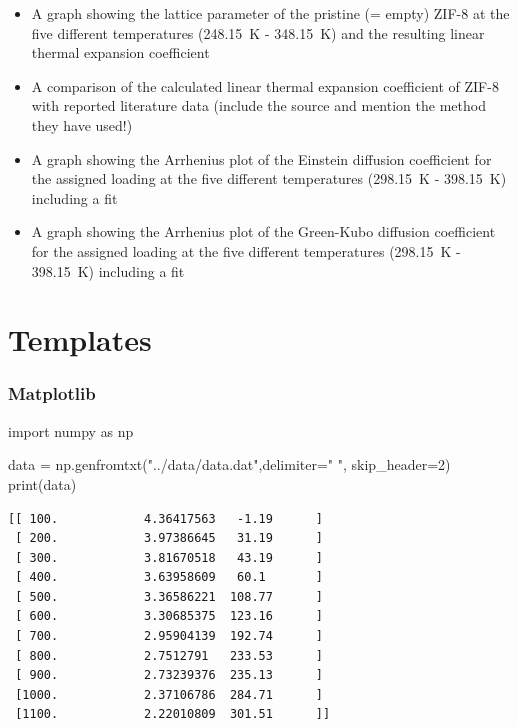 \documentclass[
  letterpaper,
]{article}
\newenvironment{Shaded}{\begin{snugshade}}{\end{snugshade}}
\newcommand{\BuiltInTok}[1]{\textcolor[rgb]{0.00,0.23,0.31}{#1}}
\newcommand{\DecValTok}[1]{\textcolor[rgb]{0.68,0.00,0.00}{#1}}
\newcommand{\ImportTok}[1]{\textcolor[rgb]{0.00,0.46,0.62}{#1}}
\newcommand{\NormalTok}[1]{\textcolor[rgb]{0.00,0.23,0.31}{#1}}
\newcommand{\OperatorTok}[1]{\textcolor[rgb]{0.37,0.37,0.37}{#1}}
\newcommand{\StringTok}[1]{\textcolor[rgb]{0.13,0.47,0.30}{#1}}
\providecommand{\tightlist}{%
  \setlength{\itemsep}{0pt}\setlength{\parskip}{0pt}}\usepackage{longtable,booktabs,array}
\begin{document}
\begin{itemize}
\tightlist
\item[$\square$]
  A graph showing the lattice parameter of the pristine (= empty) ZIF-8
  at the five different temperatures (248.15~K - 348.15~K) and the
  resulting linear thermal expansion coefficient
\item[$\square$]
  A comparison of the calculated linear thermal expansion coefficient of
  ZIF-8 with reported literature data (include the source and mention
  the method they have used!)
\item[$\square$]
  A graph showing the Arrhenius plot of the Einstein diffusion
  coefficient for the assigned loading at the five different
  temperatures (298.15~K - 398.15~K) including a fit
\item[$\square$]
  A graph showing the Arrhenius plot of the Green-Kubo diffusion
  coefficient for the assigned loading at the five different
  temperatures (298.15~K - 398.15~K) including a fit
\end{itemize}

\part{Templates}

\hypertarget{matplotlib}{%
\section{Matplotlib}\label{matplotlib}}

\begin{Shaded}
\begin{Highlighting}[]
\ImportTok{import}\NormalTok{ numpy }\ImportTok{as}\NormalTok{ np}

\NormalTok{data }\OperatorTok{=}\NormalTok{ np.genfromtxt(}\StringTok{"../data/data.dat"}\NormalTok{,delimiter}\OperatorTok{=}\StringTok{"   "}\NormalTok{, skip\_header}\OperatorTok{=}\DecValTok{2}\NormalTok{)}
\BuiltInTok{print}\NormalTok{(data)}
\end{Highlighting}
\end{Shaded}

\begin{verbatim}
[[ 100.            4.36417563   -1.19      ]
 [ 200.            3.97386645   31.19      ]
 [ 300.            3.81670518   43.19      ]
 [ 400.            3.63958609   60.1       ]
 [ 500.            3.36586221  108.77      ]
 [ 600.            3.30685375  123.16      ]
 [ 700.            2.95904139  192.74      ]
 [ 800.            2.7512791   233.53      ]
 [ 900.            2.73239376  235.13      ]
 [1000.            2.37106786  284.71      ]
 [1100.            2.22010809  301.51      ]]
\end{verbatim}
\end{document}
